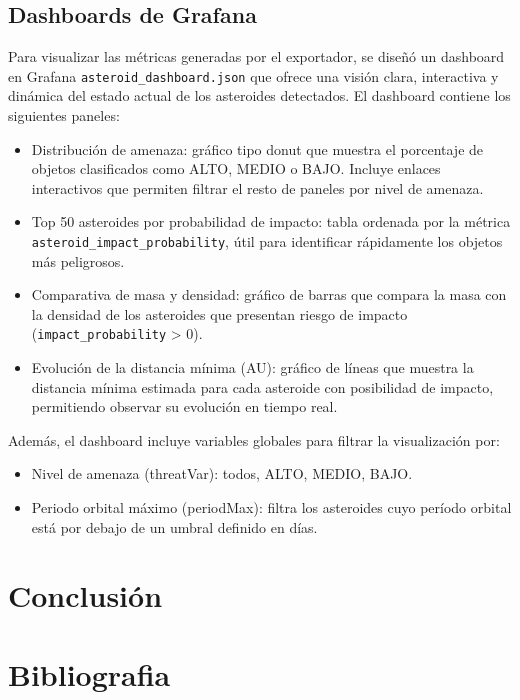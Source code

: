 \documentclass[12pt]{article}
\begin{document}
\subsection{Dashboards de Grafana}

Para visualizar las métricas generadas por el exportador, se diseñó un dashboard en Grafana \texttt{asteroid\_dashboard.json} 
que ofrece una visión clara, interactiva y dinámica del estado actual de los asteroides detectados.
El dashboard contiene los siguientes paneles:
\begin{itemize}
  \item Distribución de amenaza: gráfico tipo donut que muestra el porcentaje de objetos clasificados como 
  ALTO, MEDIO o BAJO. Incluye enlaces interactivos que permiten filtrar el resto de paneles por nivel de amenaza.
  \item Top 50 asteroides por probabilidad de impacto: tabla ordenada por la métrica
  \\ 
  \texttt{asteroid\_impact\_probability}, 
  útil para identificar rápidamente los objetos más peligrosos.
  \item Comparativa de masa y densidad: gráfico de barras que compara la masa con la densidad de los asteroides que presentan riesgo 
  de impacto (\texttt{impact\_probability} > 0).
  \item Evolución de la distancia mínima (AU): gráfico de líneas que muestra la distancia mínima estimada para cada asteroide con 
  posibilidad de impacto, permitiendo observar su evolución en tiempo real.
\end{itemize}

Además, el dashboard incluye variables globales para filtrar la visualización por:
\begin{itemize}
  \item Nivel de amenaza (threatVar): todos, ALTO, MEDIO, BAJO.
  \item Periodo orbital máximo (periodMax): filtra los asteroides cuyo período orbital está por debajo de un umbral definido en días.
\end{itemize}

\clearpage

\section{Conclusión}


\clearpage

\section{Bibliografia}

\cite{neows-api}
\cite{Sentry-System}
\cite{joke2k-faker}
\cite{numpy}
\cite{spark}
\cite{kafka}
\cite{prometheus}
\cite{grafana}


\printbibliography
\end{document}
